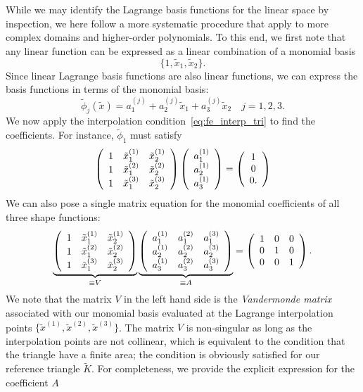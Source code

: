     While we may identify the Lagrange basis functions for the linear space by inspection, we here follow a more systematic procedure that apply to more complex domains and higher-order polynomials.  To this end, we first note that any linear function can be expressed as a linear combination of a monomial basis
\begin{equation*}
  \{ 1, \tilde x_1, \tilde x_2\}.
\end{equation*}
Since linear Lagrange basis functions are also linear functions, we can express the basis functions in terms of the monomial basis:
\begin{equation}
  \tilde \phi_j(\tilde x) = a^{(j)}_1 + a^{(j)}_2 \tilde x_1 + a_3^{(j)} \tilde x_2 \quad j = 1, 2, 3.
  \label{eq:fe_lin_tri_rep}
\end{equation}
We now apply the interpolation condition~\eqref{eq:fe_interp_tri} to find the coefficients.  For instance, $\tilde \phi_1$ must satisfy
\begin{equation*}
  \bmat{ccc}
  1 & \tilde x_1^{(1)} & \tilde x_2^{(1)} \\
  1 & \tilde x_1^{(2)} & \tilde x_2^{(2)} \\
  1 & \tilde x_1^{(3)} & \tilde x_2^{(3)} \\
  \emat
  \bmat{ccc}
  a_1^{(1)} \\ a_2^{(1)} \\ a_3^{(1)}
  \emat
  =
  \bmat{ccc}
  1 \\ 0 \\ 0.
  \emat
\end{equation*}
We can also pose a single matrix equation for the monomial coefficients of all three shape functions: 
\begin{equation*}
  \underbrace{ \bmat{ccc}
      1 & \tilde x_1^{(1)} & \tilde x_2^{(1)} \\
  1 & \tilde x_1^{(2)} & \tilde x_2^{(2)} \\
  1 & \tilde x_1^{(3)} & \tilde x_2^{(3)} \\
  \emat }_{\equiv V}
  \underbrace{ 
  \bmat{ccc}
  a_1^{(1)} & a_1^{(2)} & a_1^{(3)} \\
  a_2^{(1)} & a_2^{(2)} & a_2^{(3)} \\
  a_3^{(1)} & a_3^{(2)} & a_3^{(3)} \\
  \emat
  }_{\equiv A}
  =
  \bmat{ccc}
  1 & 0 & 0 \\
  0 & 1 & 0 \\
  0 & 0 & 1
  \emat.
\end{equation*}
We note that the matrix $V$ in the left hand side is the \emph{Vandermonde matrix} associated with our monomial basis evaluated at the Lagrange interpolation points $\{\tilde x^{(1)},\tilde x^{(2)}, \tilde x^{(3)}\}$.  The matrix $V$ is non-singular as long as the interpolation points are not collinear, which is equivalent to the condition that the triangle have a finite area; the condition is obviously satisfied for our reference triangle $\tilde K$.  For completeness, we provide the explicit expression for the coefficient $A$
